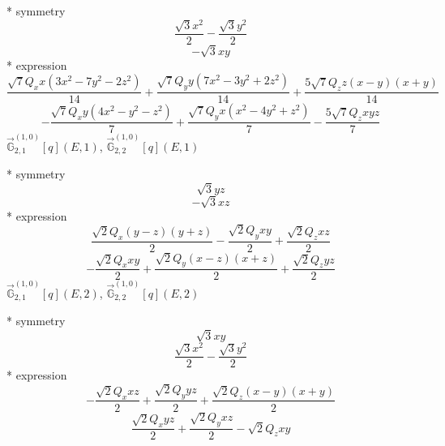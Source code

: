 \documentclass[fleqn,8pt]{jsarticle}
\begin{document}
\noindent\quad ** symmetry
\begin{dmath*}
\frac{\sqrt{3} x^{2}}{2} - \frac{\sqrt{3} y^{2}}{2}
\end{dmath*}
\begin{dmath*}
- \sqrt{3} x y
\end{dmath*}
\noindent\quad ** expression
\begin{dmath*}
\frac{\sqrt{7} Q_{x} x \left(3 x^{2} - 7 y^{2} - 2 z^{2}\right)}{14} + \frac{\sqrt{7} Q_{y} y \left(7 x^{2} - 3 y^{2} + 2 z^{2}\right)}{14} + \frac{5 \sqrt{7} Q_{z} z \left(x - y\right) \left(x + y\right)}{14}
\end{dmath*}
\begin{dmath*}
- \frac{\sqrt{7} Q_{x} y \left(4 x^{2} - y^{2} - z^{2}\right)}{7} + \frac{\sqrt{7} Q_{y} x \left(x^{2} - 4 y^{2} + z^{2}\right)}{7} - \frac{5 \sqrt{7} Q_{z} x y z}{7}
\end{dmath*}
\noindent\quad $\vec{\mathbb{G}}_{2,1}^{(1,0)}[q](E,1)$, $\vec{\mathbb{G}}_{2,2}^{(1,0)}[q](E,1)$

\noindent\quad ** symmetry
\begin{dmath*}
\sqrt{3} y z
\end{dmath*}
\begin{dmath*}
- \sqrt{3} x z
\end{dmath*}
\noindent\quad ** expression
\begin{dmath*}
\frac{\sqrt{2} Q_{x} \left(y - z\right) \left(y + z\right)}{2} - \frac{\sqrt{2} Q_{y} x y}{2} + \frac{\sqrt{2} Q_{z} x z}{2}
\end{dmath*}
\begin{dmath*}
- \frac{\sqrt{2} Q_{x} x y}{2} + \frac{\sqrt{2} Q_{y} \left(x - z\right) \left(x + z\right)}{2} + \frac{\sqrt{2} Q_{z} y z}{2}
\end{dmath*}
\noindent\quad $\vec{\mathbb{G}}_{2,1}^{(1,0)}[q](E,2)$, $\vec{\mathbb{G}}_{2,2}^{(1,0)}[q](E,2)$

\noindent\quad ** symmetry
\begin{dmath*}
\sqrt{3} x y
\end{dmath*}
\begin{dmath*}
\frac{\sqrt{3} x^{2}}{2} - \frac{\sqrt{3} y^{2}}{2}
\end{dmath*}
\noindent\quad ** expression
\begin{dmath*}
- \frac{\sqrt{2} Q_{x} x z}{2} + \frac{\sqrt{2} Q_{y} y z}{2} + \frac{\sqrt{2} Q_{z} \left(x - y\right) \left(x + y\right)}{2}
\end{dmath*}
\begin{dmath*}
\frac{\sqrt{2} Q_{x} y z}{2} + \frac{\sqrt{2} Q_{y} x z}{2} - \sqrt{2} Q_{z} x y
\end{dmath*}
\end{document}
